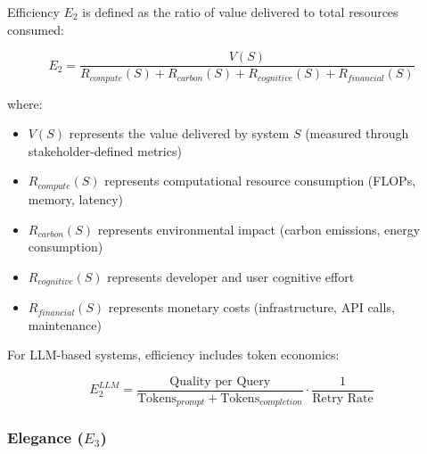 \begin{definition}[Efficiency]
\label{def:efficiency}
Efficiency $E_2$ is defined as the ratio of value delivered to total resources consumed:

\begin{equation}
E_2 = \frac{V(S)}{R_{compute}(S) + R_{carbon}(S) + R_{cognitive}(S) + R_{financial}(S)}
\end{equation}

where:
\begin{itemize}[leftmargin=2em]
    \item $V(S)$ represents the value delivered by system $S$ (measured through stakeholder-defined metrics)
    \item $R_{compute}(S)$ represents computational resource consumption (FLOPs, memory, latency)
    \item $R_{carbon}(S)$ represents environmental impact (carbon emissions, energy consumption) \cite{strubell2019energy, patterson2021carbon}
    \item $R_{cognitive}(S)$ represents developer and user cognitive effort
    \item $R_{financial}(S)$ represents monetary costs (infrastructure, API calls, maintenance)
\end{itemize}

For LLM-based systems, efficiency includes token economics:

\begin{equation}
E_2^{LLM} = \frac{\text{Quality per Query}}{\text{Tokens}_{prompt} + \text{Tokens}_{completion}} \cdot \frac{1}{\text{Retry Rate}}
\end{equation}
\end{definition}

\subsubsection{Elegance (\texorpdfstring{$E_3$}{E3})}

